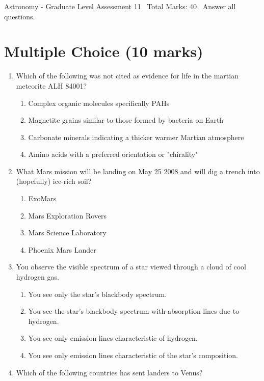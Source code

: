 \documentclass[12pt]{article}
\begin{document}
\begin{center}
Astronomy - Graduate Level Assessment 11 \
Total Marks: 40 \
Answer all questions.
\end{center}

\section*{Multiple Choice (10 marks)}
\begin{enumerate}[label=\arabic*.]
\item Which of the following was not cited as evidence for life in the martian meteorite ALH 84001?
\begin{enumerate}[label=(\alph*)]
    \item Complex organic molecules specifically PAHs
    \item Magnetite grains similar to those formed by bacteria on Earth
    \item Carbonate minerals indicating a thicker warmer Martian atmosphere
    \item Amino acids with a preferred orientation or "chirality"
\end{enumerate}
\item What Mars mission will be landing on May 25 2008 and will dig a trench into (hopefully) ice-rich soil?
\begin{enumerate}[label=(\alph*)]
    \item ExoMars
    \item Mars Exploration Rovers
    \item Mars Science Laboratory
    \item Phoenix Mars Lander
\end{enumerate}
\item You observe the visible spectrum of a star viewed through a cloud of cool hydrogen gas.
\begin{enumerate}[label=(\alph*)]
    \item You see only the star's blackbody spectrum.
    \item You see the star's blackbody spectrum with absorption lines due to hydrogen.
    \item You see only emission lines characteristic of hydrogen.
    \item You see only emission lines characteristic of the star's composition.
\end{enumerate}
\item Which of the following countries has sent landers to Venus?
\begin{enumerate}[label=(\alph*)]

\end{enumerate}
\end{enumerate}
\end{document}
